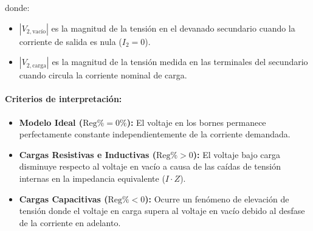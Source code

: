 donde:
\begin{itemize}
    \item $|V_{2,\text{vacío}}|$ es la magnitud de la tensión en el devanado secundario cuando la corriente de salida es nula ($I_2 = 0$).
    \item $|V_{2,\text{carga}}|$ es la magnitud de la tensión medida en las terminales del secundario cuando circula la corriente nominal de carga.
\end{itemize}

\paragraph{Criterios de interpretación:}
\begin{itemize}
    \item \textbf{Modelo Ideal ($\text{Reg\%} = 0\%$):} El voltaje en los bornes permanece perfectamente constante independientemente de la corriente demandada.
    \item \textbf{Cargas Resistivas e Inductivas ($\text{Reg\%} > 0$):} El voltaje bajo carga disminuye respecto al voltaje en vacío a causa de las caídas de tensión internas en la impedancia equivalente ($I \cdot Z$).
    \item \textbf{Cargas Capacitivas ($\text{Reg\%} < 0$):} Ocurre un fenómeno de elevación de tensión donde el voltaje en carga supera al voltaje en vacío debido al desfase de la corriente en adelanto.
\end{itemize}